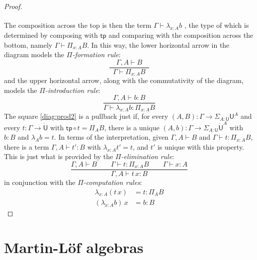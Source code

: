 \documentclass[12pt,reqno]{amsart}
\newcommand{\tp}{\ensuremath{\mathsf{tp}}}
\renewcommand{\to}{\ensuremath{\rightarrow}}
\newcommand{\G}{\ensuremath{\Gamma}}
\newcommand{\ext}[2]{{#1,#2}}
\newcommand{\T}{\ensuremath{\mathsf{U}}}
\newcommand{\TT}{\ensuremath{\dot{\mathsf{U}}}}
\theoremstyle{remark}
\theoremstyle{definition}
\begin{document}
\begin{proof}
\begin{equation*}
\begin{tikzcd}
\end{tikzcd}
\end{equation*}
The composition across the top is then the term $\G \vdash \lambda_{x:A} b$ , the type of which is determined by composing with $\tp$ and comparing with the composition across the bottom, namely $\G \vdash \Pi_{x:A} B$. In this way, the lower horizontal arrow in the diagram models the \emph{$\Pi$-formation rule}:
\[
\frac{\quad\ext{\G}{A}\vdash B\quad}{\G\vdash \Pi_{x:A} B}
\]
and the upper horizontal arrow, along with the commutativity of the diagram, models the \emph{$\Pi$-introduction rule}:
\[
\frac{\ext{\G}{A}\vdash b:B}{\G\vdash \lambda_{x:A} b : \Pi_{x:A} B}
\]
The square \eqref{diag:prod2} is a pullback just if, for every $(A,B) : \G \to \Sigma_{A:\T}\T^A$ and every $t: \G \to \TT$ with $\tp \circ t = \Pi_A B$, there is a unique $(A,b) : \G \to \Sigma_{A:\T}\TT^A$ with $b:B$ and $\lambda_A b = t$.  In terms of the interpretation, given $\ext{\G}{A} \vdash B$ and $\G\vdash t: \Pi_{x:A} B$, there is a term $\ext{\G}{A}\vdash t':B$ with $\lambda_{x:A}  t' = t$, and $t'$ is unique with this property.  This is just what is provided by the \emph{$\Pi$-elimination rule}:
\[
\frac{{\ext{\G}{A} \vdash B}\qquad {\G \vdash t : \Pi_{x:A}  B} \qquad {\G \vdash x:A}}{{\ext{\G}{A}\vdash t\, x :B}}
\]
in conjunction with the \emph{$\Pi$-computation rules}:
\begin{align*}
\lambda_{x:A} (t\,x) &= t : \Pi_A B\\
(\lambda_{x:A} b)\,x &= b : B
\end{align*}
\end{proof}


\section{Martin-L\"of algebras}\label{sec:MLalgebras}
\end{document}
